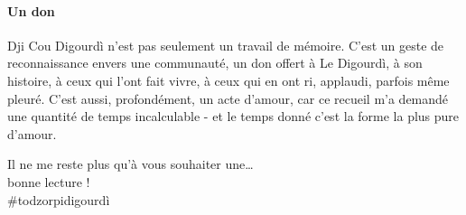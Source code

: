 \paragraph*{Un don}
Dji Cou Digourdì n’est pas seulement un travail de mémoire. C’est un geste de reconnaissance envers une communauté, un don offert à Le Digourdì, à son histoire, à ceux qui l’ont fait vivre, à ceux qui en ont ri, applaudi, parfois même pleuré. C’est aussi, profondément, un acte d’amour, car ce recueil m’a demandé une quantité de temps incalculable - et le temps donné c’est la forme la plus pure d’amour.
\begin{center}
Il ne me reste plus qu'à vous souhaiter une\ldots\\\vfill bonne lecture !\\\vfill\#todzorpidigourdì
\end{center}